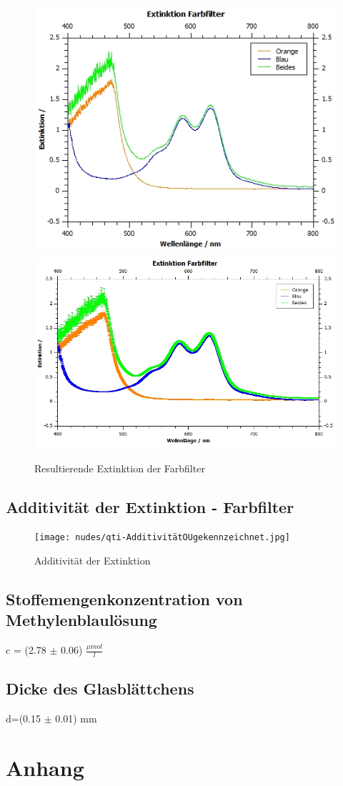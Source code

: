 \documentclass[12pt,a4paper,twoside]{article}
\begin{document}
\begin{figure}[H]
    \centering
    \includegraphics[width=0.4\linewidth]{nudes/qti-Extinktion-FarbfilterOU.jpg}
    \includegraphics[width=0.4\linewidth]{nudes/qti-Extinktion-Farbfilter.jpg}
    \caption{Resultierende Extinktion der Farbfilter}
    \label{fig:ExtinktionFarbfilterAW}
\end{figure}


\subsection{Additivität der Extinktion - Farbfilter}

\begin{figure}[H]
    \centering
    \texttt{[image: nudes/qti-AdditivitätOUgekennzeichnet.jpg]}
    \caption{Additivität der Extinktion}
    \label{fig:AdditivitätExtinktionAW}
\end{figure}


\subsection{Stoffemengenkonzentration von Methylenblaulösung}

c = (2.78 $\pm$ 0.06) $\frac{\mu mol}{l}$


\subsection{Dicke des Glasblättchens}

d=(0.15 $\pm$ 0.01) mm

\section{Anhang}
\end{document}
